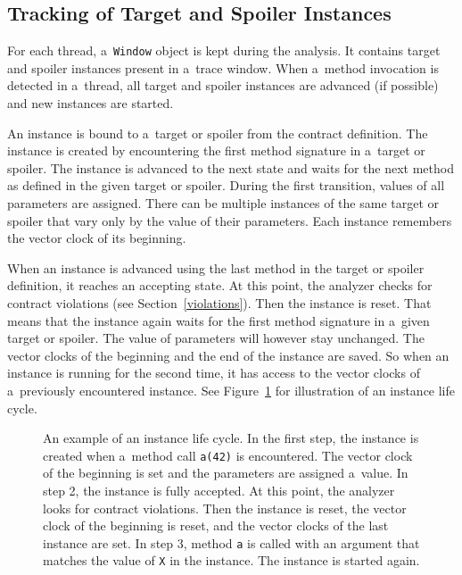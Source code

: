 \subsection{Tracking of Target and Spoiler Instances}

For each thread, a~\texttt{Window} object is kept during the analysis. It
contains target and spoiler instances present in a~trace window. When a~method
invocation is detected in a~thread, all target and spoiler instances are
advanced (if possible) and new instances are started.

An instance is bound to a~target or spoiler from the contract definition. The
instance is created by encountering the first method signature in a~target or
spoiler. The instance is advanced to the next state and waits for the next
method as defined in the given target or spoiler. During the first transition,
values of all parameters are assigned. There can be multiple instances of the
same target or spoiler that vary only by the value of their parameters. Each
instance remembers the vector clock of its beginning.

When an instance is advanced using the last method in the target or spoiler
definition, it reaches an accepting state. At this point, the analyzer checks
for contract violations (see Section~\ref{violations}). Then the instance is
reset. That means that the instance again waits for the first method signature
in a~given target or spoiler. The value of parameters will however stay
unchanged. The vector clocks of the beginning and the end of the instance are
saved. So when an instance is running for the second time, it has access to the
vector clocks of a~previously encountered instance. See
Figure~\ref{instanceLifeCycle} for illustration of an instance life cycle.

\begin{figure}[hbt]
    \begin{center}
        \label{instanceLifeCycle}
        
        
        
        
        \caption{An example of an instance life cycle. In the first step, the
        instance is created when a~method call \texttt{a(42)} is encountered.
        The vector clock of the beginning is set and the parameters are assigned
        a~value. In step 2, the instance is fully accepted. At this point, the
        analyzer looks for contract violations. Then the instance is reset, the
        vector clock of the beginning is reset, and the vector clocks of the
        last instance are set. In step 3, method \texttt{a} is called with an
        argument that matches the value of \texttt{X} in the instance. The
        instance is started again.}
    \end{center}
\end{figure}

